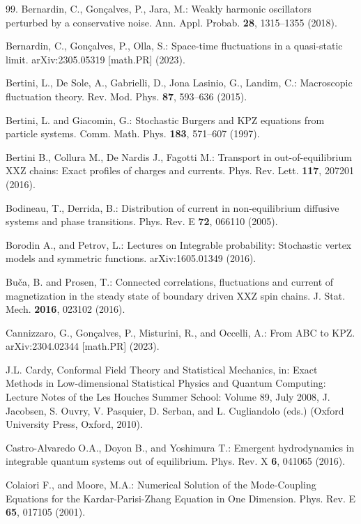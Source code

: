\documentclass[12pt]{article}
\begin{document}
\begin{thebibliography}{99.}
Bernardin, C., Gon{\c c}alves, P., Jara, M.:
Weakly harmonic oscillators perturbed by a conservative noise.
Ann. Appl. Probab. \textbf{28}, 1315--1355 (2018).

Bernardin, C., Gon{\c c}alves, P., Olla, S.:
Space-time fluctuations in a quasi-static limit.
arXiv:2305.05319 [math.PR] (2023).

Bertini, L., De Sole, A., Gabrielli, D., Jona Lasinio, G., Landim, C.:
Macroscopic fluctuation theory.
Rev. Mod. Phys. \textbf{87}, 593--636 (2015).

Bertini, L. and Giacomin, G.:
Stochastic Burgers and KPZ equations from particle systems.
Comm. Math. Phys. \textbf{183}, 571--607 (1997).

Bertini B., Collura M., De Nardis J., Fagotti M.:
Transport in out-of-equilibrium XXZ chains: Exact profiles of charges and currents.
Phys. Rev. Lett. \textbf{117}, 207201 (2016).

Bodineau, T., Derrida, B.:
Distribution of current in non-equilibrium diffusive systems and phase transitions.
Phys. Rev. E \textbf{72}, 066110 (2005).

Borodin A., and Petrov, L.:
Lectures on Integrable probability: Stochastic vertex models and symmetric functions.
arXiv:1605.01349 (2016).

Bu\v{c}a, B. and Prosen, T.:
Connected correlations, fluctuations and current of magnetization in the 
steady state of boundary driven XXZ spin chains.
J. Stat. Mech. \textbf{2016}, 023102 (2016).

Cannizzaro, G., Gon{\c c}alves, P., Misturini, R., and Occelli, A.:
From ABC to KPZ.
arXiv:2304.02344 [math.PR] (2023).

J.L. Cardy, 
Conformal Field Theory and Statistical Mechanics,
in: Exact Methods in Low-dimensional Statistical Physics and Quantum Computing: Lecture Notes of the Les Houches Summer School: Volume 89, July 2008,
J. Jacobsen, S. Ouvry, V. Pasquier, D. Serban, and L. Cugliandolo (eds.)
(Oxford University Press, Oxford, 2010).

Castro-Alvaredo O.A., Doyon B., and Yoshimura T.:
Emergent hydrodynamics in integrable quantum systems out of equilibrium.
Phys. Rev. X \textbf{6}, 041065 (2016).

Colaiori F., and Moore, M.A.:
Numerical Solution of the Mode-Coupling Equations for the 
Kardar-Parisi-Zhang Equation in One Dimension.
Phys. Rev. E \textbf{65}, 017105 (2001).


\end{thebibliography}
\end{document}
